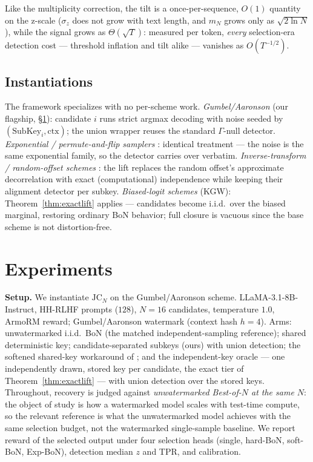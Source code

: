 \documentclass{article} %
\begin{document}
Like the multiplicity correction, the tilt is a once-per-sequence, $O(1)$
quantity on the z-scale ($\sigma_z$ does not grow with text length, and
$m_N$ grows only as $\sqrt{2\ln N}$), while the signal grows as
$\Theta(\sqrt T)$: measured per token, \emph{every} selection-era
detection cost --- threshold inflation and tilt alike --- vanishes as
$O(T^{-1/2})$.

\subsection{Instantiations}\label{sec:instantiations}
The framework specializes with no per-scheme work.
\emph{Gumbel/Aaronson} (our flagship, \S\ref{sec:experiments}): candidate $i$
runs strict argmax decoding with noise seeded by
$(\mathrm{SubKey}_i,\mathrm{ctx})$; the union wrapper reuses the standard
$\Gamma$-null detector.
\emph{Exponential / permute-and-flip samplers} \citep{zhao2024permute}: identical
treatment --- the noise is the same exponential family, so the detector carries
over verbatim.
\emph{Inverse-transform / random-offset schemes} \citep{kuditipudi2023robust}:
the lift replaces the random offset's approximate decorrelation with exact
(computational) independence while keeping their alignment detector per subkey.
\emph{Biased-logit schemes} (KGW): Theorem~\ref{thm:exactlift} applies ---
candidates become i.i.d.\ over the biased marginal, restoring ordinary BoN
behavior; full closure is vacuous since the base scheme is not
distortion-free.

\section{Experiments}\label{sec:experiments}
\textbf{Setup.} We instantiate $\mathrm{JC}_N$ on the Gumbel/Aaronson
scheme. LLaMA-3.1-8B-Instruct, HH-RLHF prompts ($128$), $N{=}16$
candidates, temperature $1.0$, ArmoRM reward; Gumbel/Aaronson watermark
(context hash $h{=}4$). Arms: unwatermarked i.i.d.\ BoN (the matched
independent-sampling reference); shared deterministic key;
candidate-separated subkeys (ours) with union detection; the softened
shared-key workaround of \citet{verma2025watermarking}; and the
independent-key oracle --- one independently drawn, stored key per candidate,
the exact tier of Theorem~\ref{thm:exactlift} --- with union detection over
the stored keys. Throughout, recovery is judged against \emph{unwatermarked
Best-of-$N$ at the same $N$}: the object of study is how a watermarked model
scales with test-time compute, so the relevant reference is what the
unwatermarked model achieves with the same selection budget, not the
watermarked single-sample baseline. We report reward of the selected
output under four selection heads (single, hard-BoN, soft-BoN, Exp-BoN), detection
median $z$ and TPR, and calibration.
\end{document}
